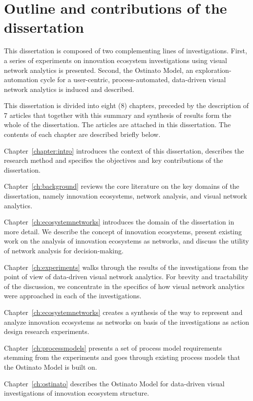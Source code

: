 \section{Outline and contributions of the dissertation}
\label{sec:structure}

This dissertation is composed of two complementing lines of investigations. First, a series of experiments on innovation ecosystem investigations using visual network analytics is presented. Second, the Ostinato Model, an exploration-automation cycle for a user-centric, process-automated, data-driven visual network analytics is induced and described.

This dissertation is divided into eight (8) chapters, preceded by the description of 7 articles that together with this summary and synthesis of results form the whole of the dissertation. The articles are attached in this dissertation. The contents of each chapter are described briefly below.

Chapter~\ref{chapter:intro} introduces the context of this dissertation, describes the research method and specifies the objectives and key contributions of the dissertation.

Chapter~\ref{ch:background} reviews the core literature on the key domains of the dissertation, namely innovation ecosystems, network analysis, and visual network analytics.

Chapter~\ref{ch:ecosystemnetworks} introduces the domain of the dissertation in more detail. We describe the concept of innovation ecosystems, present existing work on the analysis of innovation ecosystems as networks, and discuss the utility of network analysis for decision-making. 

Chapter~\ref{ch:experiments} walks through the results of the investigations from the point of view of data-driven visual network analytics. For brevity and tractability of the discussion, we concentrate in the specifics of how visual network analytics were approached in each of the investigations. 

Chapter~\ref{ch:ecosystemnetworks} creates a synthesis of the way to represent and analyze innovation ecosystems as networks on basis of the investigations as action design research experiments.

Chapter~\ref{ch:processmodels} presents a set of process model requirements stemming from the experiments and goes through existing process models that the Ostinato Model is built on. 

Chapter~\ref{ch:ostinato} describes the Ostinato Model for data-driven visual investigations of innovation ecosystem structure.

